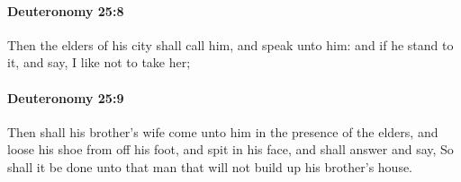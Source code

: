 		\paragraph{Deuteronomy 25:8} %
			\label{DEUTERONOMY-25-8}

			Then the elders of his city shall call him, and speak unto him: and if he stand to it, and say, I like not to take her;


		\paragraph{Deuteronomy 25:9} %
			\label{DEUTERONOMY-25-9}

			Then shall his brother's wife come unto him in the presence of the elders, and loose his shoe from off his foot, and spit in his face, and shall answer and say, So shall it be done unto that man that will not build up his brother's house.

